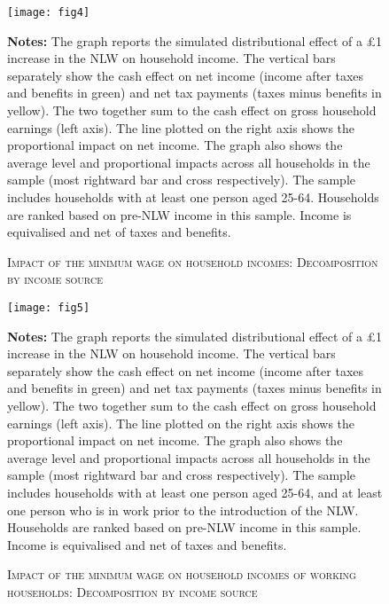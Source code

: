 \begin{figure}[pth]
\caption{\textsc{Impact of the minimum wage on household incomes: Decomposition by income source}}
\label{fig:hhinctaxsplit}
\begin{center}
\texttt{[image: fig4]}
\end{center}
\par
\footnotesize{\textbf{Notes:} The graph reports the simulated distributional effect of a \pounds 1 increase in the NLW on household income. The vertical bars separately show the cash effect on net income (income after taxes and benefits in green) and net tax payments (taxes minus benefits in yellow). The two together sum to the cash effect on gross household earnings (left axis). The line plotted on the right axis shows the proportional impact on net income. The graph also shows the average level and proportional impacts across all households in the sample (most rightward bar and cross respectively). The sample includes households with at least one person aged 25-64. Households are ranked based on pre-NLW income in this sample. Income is equivalised and net of taxes and benefits.}
\end{figure}


\begin{figure}[pth]
\caption{\textsc{Impact of the minimum wage on household incomes of working households: Decomposition by income source}}
\label{fig:hhinctaxsplitworking}
\begin{center}
\texttt{[image: fig5]}
\end{center}
\par
\footnotesize{\textbf{Notes:} The graph reports the simulated distributional effect of a \pounds 1 increase in the NLW on household income. The vertical bars separately show the cash effect on net income (income after taxes and benefits in green) and net tax payments (taxes minus benefits in yellow). The two together sum to the cash effect on gross household earnings (left axis). The line plotted on the right axis shows the proportional impact on net income. The graph also shows the average level and proportional impacts across all households in the sample (most rightward bar and cross respectively). The sample includes households with at least one person aged 25-64, and at least one person who is in work prior to the introduction of the NLW. Households are ranked based on pre-NLW income in this sample. Income is equivalised and net of taxes and benefits.}
\end{figure}



